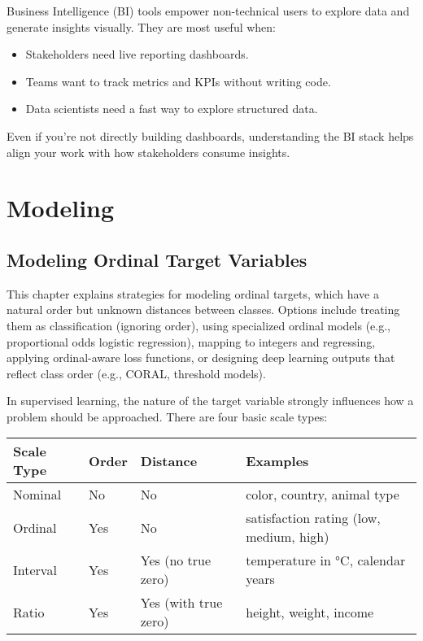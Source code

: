 \documentclass[12pt,openany]{book}
\begin{document}
Business Intelligence (BI) tools empower non-technical users to explore data and generate insights visually. They are most useful when:

\begin{itemize}
    \item Stakeholders need live reporting dashboards.
    \item Teams want to track metrics and KPIs without writing code.
    \item Data scientists need a fast way to explore structured data.
\end{itemize}

\begin{notebox}
Even if you're not directly building dashboards, understanding the BI stack helps align your work with how stakeholders consume insights.
\end{notebox}





\part{Modeling}




\chapter{Modeling Ordinal Target Variables}

\begin{summarybox}
This chapter explains strategies for modeling ordinal targets, which have a natural order but unknown distances between classes. Options include treating them as classification (ignoring order), using specialized ordinal models (e.g., proportional odds logistic regression), mapping to integers and regressing, applying ordinal-aware loss functions, or designing deep learning outputs that reflect class order (e.g., CORAL, threshold models). 
\end{summarybox}

In supervised learning, the nature of the target variable strongly influences
how a problem should be approached. There are four basic scale types:
\newline

\begin{minipage}{\textwidth}
\centering
\renewcommand{\arraystretch}{1.3} %
\begin{tabular}{m{2.5cm} m{1.5cm} m{4cm} m{7cm}}
\toprule
\textbf{Scale Type} & \textbf{Order} & \textbf{Distance} & \textbf{Examples} \\
\midrule
Nominal   & No  & No  & color, country, animal type \\
Ordinal   & Yes & No  & satisfaction rating (low, medium, high) \\
Interval  & Yes & Yes (no true zero)  & temperature in °C, calendar years \\
Ratio     & Yes & Yes (with true zero) & height, weight, income \\
\bottomrule
\end{tabular}
\end{minipage}
\vspace{5pt}
\end{document}
